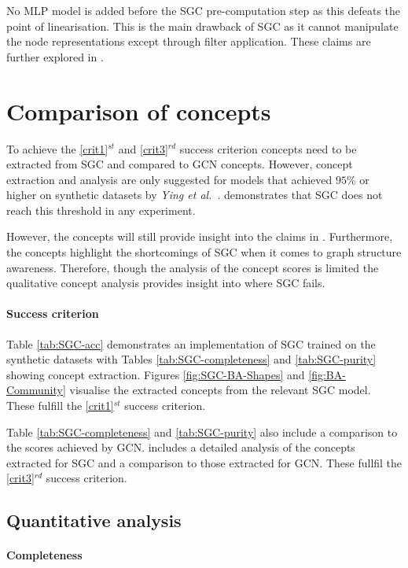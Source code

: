 No MLP model is added before the SGC pre-computation step as this defeats the point of linearisation.
This is the main drawback of SGC as it cannot manipulate the node representations except through filter application.
These claims are further explored in .

\section{Comparison of concepts}
\label{sec:comp-concept}

To achieve the \ref{crit1}$^{st}$ and \ref{crit3}$^{rd}$ success criterion concepts need to be extracted from SGC and compared to GCN concepts.
However, concept extraction and analysis are only suggested for models that achieved $95$\% or higher on synthetic datasets by \textit{Ying et al.}~\cite{ying2019gnnexplainer}.
 demonstrates that SGC does not reach this threshold in any experiment.

However, the concepts will still provide insight into the claims in .
Furthermore, the concepts highlight the shortcomings of SGC when it comes to graph structure awareness.
Therefore, though the analysis of the concept scores is limited the qualitative concept analysis provides insight into where SGC fails.

\paragraph{Success criterion}
Table \ref{tab:SGC-acc} demonstrates an implementation of SGC trained on the synthetic datasets with Tables \ref{tab:SGC-completeness} and \ref{tab:SGC-purity} showing concept extraction.
Figures \ref{fig:SGC-BA-Shapes} and \ref{fig:BA-Community} visualise the extracted concepts from the relevant SGC model. These fulfill the \ref{crit1}$^{st}$ success criterion.

Table \ref{tab:SGC-completeness} and \ref{tab:SGC-purity} also include a comparison to the scores achieved by GCN.
 includes a detailed analysis of the concepts extracted for SGC and a comparison to those extracted for GCN.
These fullfil the \ref{crit3}$^{rd}$ success criterion.

\subsection{Quantitative analysis}
\label{sec:quant}
\paragraph{Completeness}


